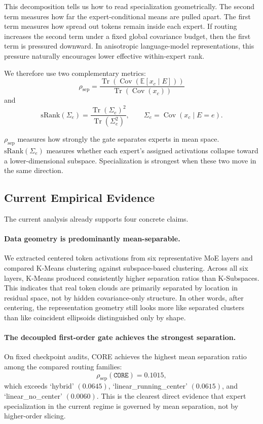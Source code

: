 This decomposition tells us how to read specialization geometrically. The second term measures how far the expert-conditional means are pulled apart. The first term measures how spread out tokens remain inside each expert. If routing increases the second term under a fixed global covariance budget, then the first term is pressured downward. In anisotropic language-model representations, this pressure naturally encourages lower effective within-expert rank.

We therefore use two complementary metrics:
$$
\rho_{\mathrm{sep}}
=
\frac{\operatorname{Tr}(\operatorname{Cov}(\mathbb{E}[x_c\mid E]))}
{\operatorname{Tr}(\operatorname{Cov}(x_c))}
$$
and
$$
\mathrm{sRank}(\Sigma_e)
=
\frac{\operatorname{Tr}(\Sigma_e)^2}{\operatorname{Tr}(\Sigma_e^2)},
\qquad
\Sigma_e=\operatorname{Cov}(x_c\mid E=e).
$$

$\rho_{\mathrm{sep}}$ measures how strongly the gate separates experts in mean space. $\mathrm{sRank}(\Sigma_e)$ measures whether each expert's assigned activations collapse toward a lower-dimensional subspace. Specialization is strongest when these two move in the same direction.

\subsection{Current Empirical Evidence}
The current analysis already supports four concrete claims.

\paragraph{Data geometry is predominantly mean-separable.}
We extracted centered token activations from six representative MoE layers and compared K-Means clustering against subspace-based clustering. Across all six layers, K-Means produced consistently higher separation ratios than K-Subspaces. This indicates that real token clouds are primarily separated by location in residual space, not by hidden covariance-only structure. In other words, after centering, the representation geometry still looks more like separated clusters than like coincident ellipsoids distinguished only by shape.

\paragraph{The decoupled first-order gate achieves the strongest separation.}
On fixed checkpoint audits, CORE achieves the highest mean separation ratio among the compared routing families:
$$
\rho_{\mathrm{sep}}(\texttt{CORE})=0.1015,
$$
which exceeds `hybrid' $(0.0645)$, `linear\_running\_center' $(0.0615)$, and `linear\_no\_center' $(0.0060)$. This is the clearest direct evidence that expert specialization in the current regime is governed by mean separation, not by higher-order slicing.

